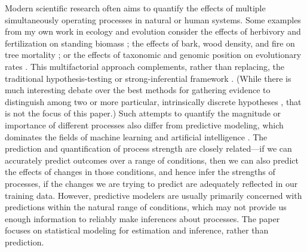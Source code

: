 \documentclass[entropy,article,accept,pdftex,moreauthors]{Definitions/mdpi}
\begin{document}
Modern scientific research often aims to quantify the effects of
multiple simultaneously operating processes in natural or human systems.
Some examples from my own work in ecology and evolution consider the
effects of herbivory and fertilization on standing biomass \cite{ref-Gruner+2008}; %
 the effects of bark, wood density, and fire on tree mortality
\cite{ref-brando_fire-induced_2012}; or the effects of taxonomic and genomic position
on evolutionary rates \cite{ref-ghenu_multicopy_2016}. This multifactorial
approach \cite{ref-mcgill_why_2016} complements, rather than replacing, the
traditional hypothesis-testing or strong-inferential framework \cite{ref-platt_strong_1964, ref-fox_why_2016, ref-betini_why_2017}. (While there   is much interesting debate over the best methods for gathering evidence to distinguish among two or more particular, intrinsically discrete hypotheses \cite{ref-taper_evidential_2015},
  that is not the focus of this paper.) %
 Such attempts to quantify the
magnitude or importance of different processes also differ from
predictive modeling, which dominates the fields of machine learning and
artificial intelligence \cite{ref-hastieElements2009}.
The prediction and quantification of process strength are closely related---if we can accurately predict outcomes over a range of conditions,
then we can also predict the effects of changes in those conditions, and
hence infer the strengths of processes, if the changes we are trying
to predict are adequately reflected in our training data. However,
predictive modelers are usually primarily concerned with predictions
within the natural range of conditions, which may not provide us enough
information to reliably make inferences about processes. The paper
focuses on statistical modeling for estimation and inference, rather
than prediction.
\end{document}
